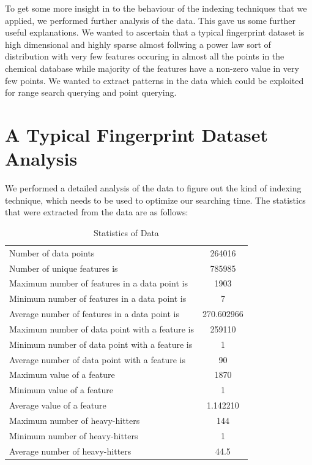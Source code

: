 To get some more insight in to the behaviour of the indexing techniques that we applied, we performed further analysis of the data. This gave us some further useful explanations. We wanted to ascertain that a typical fingerprint dataset is high dimensional and highly sparse almost follwing a power law sort of distribution with very few features occuring in almost all the points in the chemical database while majority of the features have a non-zero value in very few points. We wanted to extract patterns in the data which could be exploited for range search querying and point querying.\\

\section{A Typical Fingerprint Dataset Analysis}
We performed a detailed analysis of the data to figure out the kind of indexing technique, which needs to be used to optimize our searching time. The statistics that were extracted from the data are as follows:\\

\begin{table}[ht!]
\centering
\caption{Statistics of Data}
\begin{tabular}{|l|c|}
\hline 
Number of data points & 264016 \\ 
Number of unique features is & 785985 \\ 
Maximum number of features in a data point is & 1903 \\ 
Minimum number of features in a data point is  & 7 \\ 
Average number of features in a data point is & 270.602966 \\ 
Maximum number of data point with a feature is & 259110 \\ 
Minimum number of data point with a feature is & 1 \\ 
Average number of data point with a feature is & 90
 \\ 
Maximum value of a feature  & 1870 \\ 
Minimum value of a feature
 & 1 \\ 
Average value of a feature & 1.142210 \\ 
Maximum number of heavy-hitters  & 144 \\ 
Minimum number of heavy-hitters  & 1 \\ 
 Average number of heavy-hitters  & 44.5 \\ 
\hline 
\end{tabular} 
\end{table}


